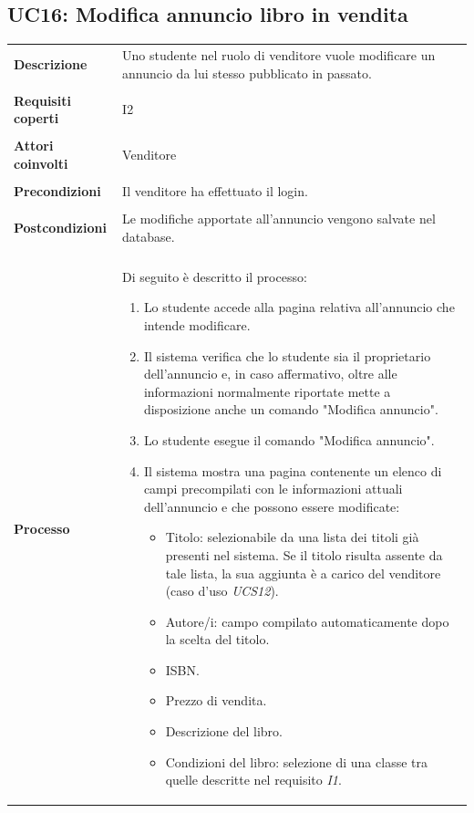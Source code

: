 \documentclass[10pt,a4paper]{article}
\begin{document}
	\subsection{UC16: Modifica annuncio libro in vendita}
	\begin{tabular}{lp{}}
		\textbf{Descrizione}&Uno studente nel ruolo di venditore vuole modificare un annuncio da lui stesso pubblicato in passato.\\
		\\
		\textbf{Requisiti coperti}&I2\\
		\\
		\textbf{Attori coinvolti}&Venditore\\
		\\
		\textbf{Precondizioni}&Il venditore ha effettuato il login.\\
		\\
		\textbf{Postcondizioni}&Le modifiche apportate all'annuncio vengono salvate nel database.\\
		\\
		\textbf{Processo}&Di seguito è descritto il processo:
		\begin{enumerate}
			\item Lo studente accede alla pagina relativa all'annuncio che intende modificare.
			\item Il sistema verifica che lo studente sia il proprietario dell'annuncio e, in caso affermativo, oltre alle informazioni normalmente riportate mette a disposizione anche un comando "Modifica annuncio".
			\item Lo studente esegue il comando "Modifica annuncio".
			\item Il sistema mostra una pagina contenente un elenco di campi precompilati con le informazioni attuali dell'annuncio e che possono essere modificate:
			\begin{itemize}
				\item Titolo: selezionabile da una lista dei titoli già presenti nel sistema. Se il titolo risulta assente da tale lista, la sua aggiunta è a carico del venditore (caso d'uso \textit{UCS12}).
				\item Autore/i: campo compilato automaticamente dopo la scelta del titolo.
				\item ISBN.
				\item Prezzo di vendita.
				\item Descrizione del libro.
				\item Condizioni del libro: selezione di una classe tra quelle descritte nel requisito \textit{I1}.

\end{itemize}
\end{enumerate}
\end{tabular}
\end{document}
